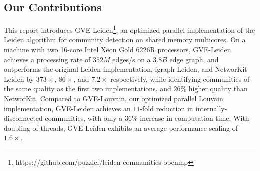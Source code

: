 






\subsection{Our Contributions}

This report introduces GVE-Leiden\footnote{https://github.com/puzzlef/leiden-communities-openmp}, an optimized parallel implementation of the Leiden algorithm for community detection on shared memory multicores. On a machine with two 16-core Intel Xeon Gold 6226R processors, GVE-Leiden achieves a processing rate of $352 M$ edges/s on a $3.8 B$ edge graph, and outperforms the original Leiden implementation, igraph Leiden, and NetworKit Leiden by $373\times$, $86\times$, and $7.2\times$ respectively, while identifying communities of the same quality as the first two implementations, and $26\%$ higher quality than NetworKit. Compared to GVE-Louvain, our optimized parallel Louvain implementation, GVE-Leiden achieves an $11$-fold reduction in internally-disconnected communities, with only a $36\%$ increase in computation time. With doubling of threads, GVE-Leiden exhibits an average performance scaling of $1.6\times$.





